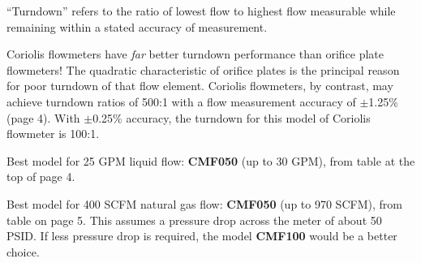 
``Turndown'' refers to the ratio of lowest flow to highest flow measurable while remaining within a stated accuracy of measurement.

\vskip 10pt

Coriolis flowmeters have {\it far} better turndown performance than orifice plate flowmeters!  The quadratic characteristic of orifice plates is the principal reason for poor turndown of that flow element.  Coriolis flowmeters, by contrast, may achieve turndown ratios of 500:1 with a flow measurement accuracy of $\pm$1.25\% (page 4).  With $\pm$0.25\% accuracy, the turndown for this model of Coriolis flowmeter is 100:1.

\vskip 10pt

Best model for 25 GPM liquid flow: {\bf CMF050} (up to 30 GPM), from table at the top of page 4.

\vskip 10pt

Best model for 400 SCFM natural gas flow: {\bf CMF050} (up to 970 SCFM), from table on page 5.  This assumes a pressure drop across the meter of about 50 PSID.  If less pressure drop is required, the model {\bf CMF100} would be a better choice.




